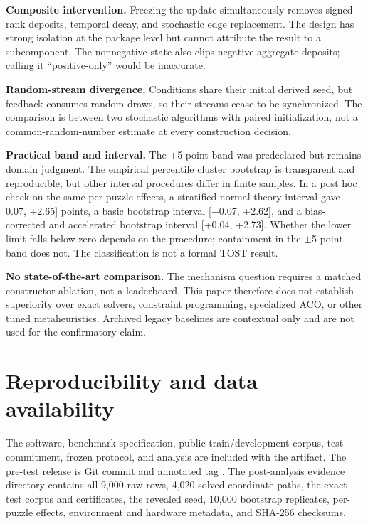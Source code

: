 \documentclass[pdflatex,sn-basic,iicol]{sn-jnl}
\begin{document}
\textbf{Composite intervention.} Freezing the update simultaneously removes signed rank deposits, temporal decay, and stochastic edge replacement. The design has strong isolation at the package level but cannot attribute the result to a subcomponent. The nonnegative state also clips negative aggregate deposits; calling it ``positive-only'' would be inaccurate.

\textbf{Random-stream divergence.} Conditions share their initial derived seed, but feedback consumes random draws, so their streams cease to be synchronized. The comparison is between two stochastic algorithms with paired initialization, not a common-random-number estimate at every construction decision.

\textbf{Practical band and interval.} The \(\pm\)5-point band was predeclared but remains domain judgment. The empirical percentile cluster bootstrap is transparent and reproducible, but other interval procedures differ in finite samples. In a post hoc check on the same per-puzzle effects, a stratified normal-theory interval gave [\(-\)0.07, +2.65] points, a basic bootstrap interval [\(-\)0.07, +2.62], and a bias-corrected and accelerated bootstrap interval [+0.04, +2.73]. Whether the lower limit falls below zero depends on the procedure; containment in the \(\pm\)5-point band does not. The classification is not a formal TOST result.

\textbf{No state-of-the-art comparison.} The mechanism question requires a matched constructor ablation, not a leaderboard. This paper therefore does not establish superiority over exact solvers, constraint programming, specialized ACO, or other tuned metaheuristics. Archived legacy baselines are contextual only and are not used for the confirmatory claim.

\section{Reproducibility and data availability}

The software, benchmark specification, public train/development corpus, test commitment, frozen protocol, and analysis are included with the artifact. The pre-test release is Git commit  and annotated tag . The post-analysis evidence directory contains all 9,000 raw rows, 4,020 solved coordinate paths, the exact test corpus and certificates, the revealed seed, 10,000 bootstrap replicates, per-puzzle effects, environment and hardware metadata, and SHA-256 checksums.
\end{document}
